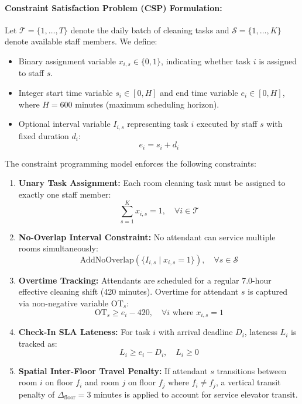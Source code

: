 \documentclass[11pt,a4paper]{article}
\begin{document}
\paragraph{Constraint Satisfaction Problem (CSP) Formulation:}
Let $\mathcal{T} = \{1, \dots, T\}$ denote the daily batch of cleaning tasks and $\mathcal{S} = \{1, \dots, K\}$ denote available staff members. We define:
\begin{itemize}
    \item Binary assignment variable $x_{i, s} \in \{0, 1\}$, indicating whether task $i$ is assigned to staff $s$.
    \item Integer start time variable $s_i \in [0, H]$ and end time variable $e_i \in [0, H]$, where $H = 600$ minutes (maximum scheduling horizon).
    \item Optional interval variable $I_{i, s}$ representing task $i$ executed by staff $s$ with fixed duration $d_i$:
    \begin{equation}
    e_i = s_i + d_i
    \end{equation}
\end{itemize}

The constraint programming model enforces the following constraints:
\begin{enumerate}
    \item \textbf{Unary Task Assignment:} Each room cleaning task must be assigned to exactly one staff member:
    \begin{equation}
    \sum_{s=1}^{K} x_{i, s} = 1, \quad \forall i \in \mathcal{T}
    \end{equation}
    \item \textbf{No-Overlap Interval Constraint:} No attendant can service multiple rooms simultaneously:
    \begin{equation}
    \text{AddNoOverlap}\left(\{I_{i, s} \mid x_{i, s} = 1\}\right), \quad \forall s \in \mathcal{S}
    \end{equation}
    \item \textbf{Overtime Tracking:} Attendants are scheduled for a regular 7.0-hour effective cleaning shift (420 minutes). Overtime for attendant $s$ is captured via non-negative variable $\text{OT}_s$:
    \begin{equation}
    \text{OT}_s \ge e_i - 420, \quad \forall i \text{ where } x_{i, s} = 1
    \end{equation}
    \item \textbf{Check-In SLA Lateness:} For task $i$ with arrival deadline $D_i$, lateness $L_i$ is tracked as:
    \begin{equation}
    L_i \ge e_i - D_i, \quad L_i \ge 0
    \end{equation}
    \item \textbf{Spatial Inter-Floor Travel Penalty:} If attendant $s$ transitions between room $i$ on floor $f_i$ and room $j$ on floor $f_j$ where $f_i \neq f_j$, a vertical transit penalty of $\Delta_{\text{floor}} = 3$ minutes is applied to account for service elevator transit.
\end{enumerate}
\end{document}
